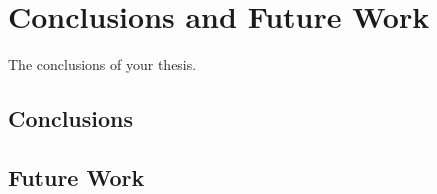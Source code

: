 \chapter{Conclusions and Future Work}
\label{chp:conclusion}

The conclusions of your thesis.

\section{Conclusions}\label{sec:conclusions}

\section{Future Work}\label{sec:future_work}
